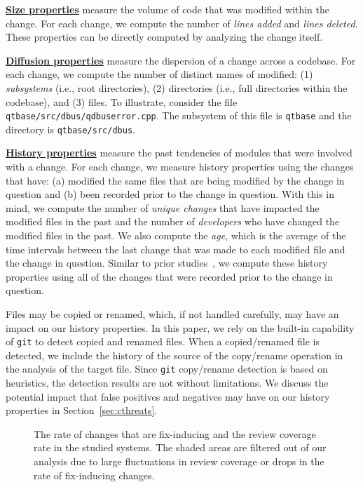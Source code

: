\underline{\bf Size properties} measure the volume of code that was modified within the change.
For each change, we compute the number of {\em lines added} and {\em lines deleted}.
These properties can be directly computed by analyzing the change itself.

\newpage
\underline{\bf Diffusion properties} measure the dispersion of a change across a codebase.
For each change, we compute the number of distinct names of modified: (1) {\em subsystems} (i.e., root directories), (2) directories (i.e., full directories within the codebase), and (3) files.
To illustrate, consider the file {\tt qtbase/src/dbus/qdbuserror.cpp}.
The subsystem of this file is {\tt qtbase} and the directory is {\tt qtbase/src/dbus}.

\underline{\bf History properties} measure the past tendencies of modules that were involved with a change.
For each change, we measure history properties using the changes that have:
(a) modified the same files that are being modified by the change in question and
(b) been recorded prior to the change in question.
With this in mind, we compute the number of {\em unique changes} that have impacted the modified files in the past and the number of {\em developers} who have changed the modified files in the past.
We also compute the {\em age}, which is the average of the time intervals between the last change that was made to each modified file and the change in question.
Similar to prior studies~\cite{mockus2000bell, kamei2013tse}, we compute these history properties using all of the changes that were recorded prior to the change in question.

Files may be copied or renamed, which, if not handled carefully, may have an impact on our history properties.
In this paper, we rely on the built-in capability of {\tt git} to detect copied and renamed files.
When a copied/renamed file is detected, we include the history of the source of the copy/rename operation in the analysis of the target file.
Since {\tt git} copy/rename detection is based on heuristics, the detection results are not without limitations.
We discuss the potential impact that false positives and negatives may have on our history properties in Section~\ref{sec:cthreats}.

\begin{figure}[t]
  \centering
  \caption{The rate of changes that are fix-inducing and the review coverage rate in the studied systems. The shaded areas are filtered out of our analysis due to large fluctuations in review coverage or drops in the rate of fix-inducing changes.}
  \label{fig:filtering}
\end{figure}

